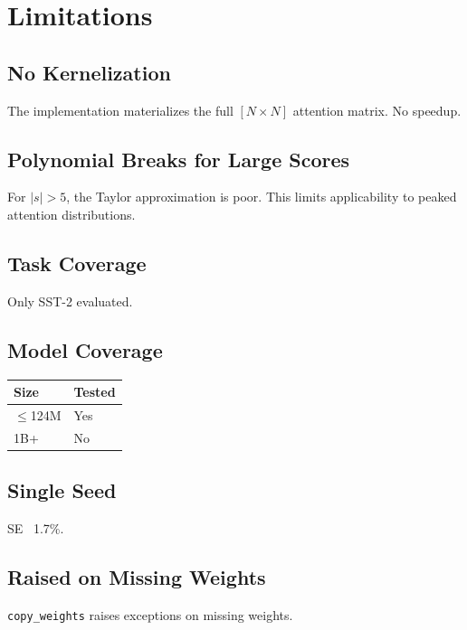 \section{Limitations}

\subsection{No Kernelization}

The implementation materializes the full $[N \times N]$ attention matrix. 
No speedup.

\subsection{Polynomial Breaks for Large Scores}

For $|s| > 5$, the Taylor approximation is poor. This limits applicability 
to peaked attention distributions.

\subsection{Task Coverage}

Only SST-2 evaluated.

\subsection{Model Coverage}

\begin{table}[H]
\centering
\small
\begin{tabular}{ll}
\toprule
\textbf{Size} & \textbf{Tested} \\
\midrule
$\le$124M & Yes \\
1B+ & No \\
\bottomrule
\end{tabular}
\end{table}

\subsection{Single Seed}

SE ~1.7\%.

\subsection{Raised on Missing Weights}

\texttt{copy\_weights} raises exceptions on missing weights.

